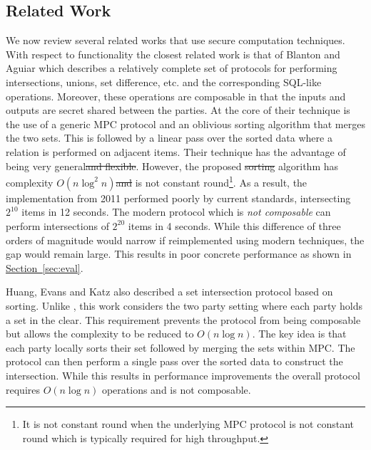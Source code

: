 \documentclass[11pt,letterpaper]{article}
\newcommand{\namedref}[2]{\hyperref[#2]{#1~\ref*{#2}}}
\newcommand{\sectionref}[1]{\namedref{Section}{#1}}
\providecommand{\DIFaddtex}[1]{{\protect\color{blue}\uwave{#1}}} %
\providecommand{\DIFdeltex}[1]{{\protect\color{red}\sout{#1}}}                      %
\providecommand{\DIFaddbegin}{} %
\providecommand{\DIFaddend}{} %
\providecommand{\DIFdelbegin}{} %
\providecommand{\DIFdelend}{} %
\providecommand{\DIFadd}[1]{\texorpdfstring{\DIFaddtex{#1}}{#1}} %
\providecommand{\DIFdel}[1]{\texorpdfstring{\DIFdeltex{#1}}{}} %
\begin{document}
\subsection{Related Work}
We now review several related works that use secure computation techniques. With respect to functionality the closest related work is that of Blanton and Aguiar\cite{ASIACCS:BlaAgu12} which describes a relatively complete set of protocols for performing intersections, unions, set difference, etc. and the corresponding SQL-like operations. Moreover, these operations are composable in that the inputs and outputs are secret shared between the parties. At the core of their technique is the use of a generic MPC protocol and an oblivious sorting algorithm that merges the two sets. This is followed by a linear pass over the sorted data where a relation is performed on adjacent items. Their technique has the advantage of being very general\DIFdelbegin \DIFdel{and flexible}\DIFdelend . However, the proposed \DIFdelbegin \DIFdel{sorting }\DIFdelend algorithm has complexity $O(n \log^2 n)$\DIFdelbegin \DIFdel{and }\DIFdelend \DIFaddbegin \DIFadd{, }\DIFaddend is not constant round\footnote{It is not constant round when the underlying MPC protocol is not constant round which is typically required for high throughput.}\DIFaddbegin \DIFadd{,  and also requires unique join keys}\DIFaddend . 
\iffullversion
As a result, the implementation from 2011 performed poorly by current standards, intersecting $2^{10}$ items in 12 seconds. The modern protocol \cite{CCS:KKRT16} which is \emph{not composable} can perform intersections of $2^{20}$ items in 4 seconds. While this difference of three orders of magnitude would narrow if reimplemented using modern techniques, the gap would remain large.
\else
This results in poor concrete performance as shown in \sectionref{sec:eval}.
\fi


\iffullversion
Huang, Evans and Katz\cite{HEK12} also described a set intersection protocol based on sorting. Unlike \cite{ASIACCS:BlaAgu12}, this work considers the two party setting where each party holds a set in the clear.
This requirement prevents the protocol from being composable but allows the complexity to be reduced to $O(n\log n)$. The key idea is that each party locally sorts their set followed by merging the sets within MPC. The protocol can then perform a single pass over the sorted data to construct the intersection. While this results in performance improvements the overall protocol requires  $O(n\log n)$ operations and is not composable.
\fi
\end{document}
